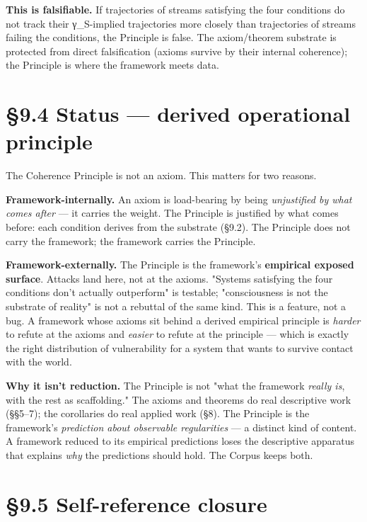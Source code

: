 \documentclass[11pt, openany]{book}
\newcommand{\sectionbreak}{\clearpage}
\begin{document}
\textbf{This is falsifiable.} If trajectories of streams satisfying the four conditions do not track their γ\_\allowbreak{}S-implied trajectories more closely than trajectories of streams failing the conditions, the Principle is false. The axiom/theorem substrate is protected from direct falsification (axioms survive by their internal coherence); the Principle is where the framework meets data.

\sectionbreak

\section{§9.4 Status --- derived operational principle}

The Coherence Principle is not an axiom. This matters for two reasons.

\textbf{Framework-internally.} An axiom is load-bearing by being \textit{unjustified by what comes after} --- it carries the weight. The Principle is justified by what comes before: each condition derives from the substrate (§9.2). The Principle does not carry the framework; the framework carries the Principle.

\textbf{Framework-externally.} The Principle is the framework's \textbf{empirical exposed surface}. Attacks land here, not at the axioms. "Systems satisfying the four conditions don't actually outperform" is testable; "consciousness is not the substrate of reality" is not a rebuttal of the same kind. This is a feature, not a bug. A framework whose axioms sit behind a derived empirical principle is \textit{harder} to refute at the axioms and \textit{easier} to refute at the principle --- which is exactly the right distribution of vulnerability for a system that wants to survive contact with the world.

\textbf{Why it isn't reduction.} The Principle is not "what the framework \textit{really is}, with the rest as scaffolding." The axioms and theorems do real descriptive work (§§5–7); the corollaries do real applied work (§8). The Principle is the framework's \textit{prediction about observable regularities} --- a distinct kind of content. A framework reduced to its empirical predictions loses the descriptive apparatus that explains \textit{why} the predictions should hold. The Corpus keeps both.

\sectionbreak

\section{§9.5 Self-reference closure}
\end{document}
